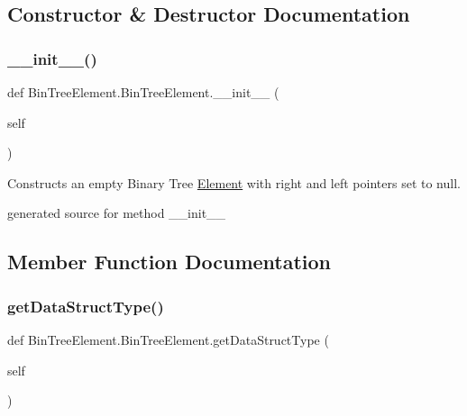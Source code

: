 \subsection{Constructor \& Destructor Documentation}
\hypertarget{class_bin_tree_element_1_1_bin_tree_element_a9a6be9d4770ea3113e0e622b0d71a035}{}\label{class_bin_tree_element_1_1_bin_tree_element_a9a6be9d4770ea3113e0e622b0d71a035} 
\subsubsection{\texorpdfstring{\+\_\+\+\_\+init\+\_\+\+\_\+()}{\_\_init\_\_()}}
{\footnotesize\ttfamily def Bin\+Tree\+Element.\+Bin\+Tree\+Element.\+\_\+\+\_\+init\+\_\+\+\_\+ (\begin{DoxyParamCaption}\item[{}]{self }\end{DoxyParamCaption})}



Constructs an empty Binary Tree \hyperlink{namespace_element}{Element} with right and left pointers set to null. 

\begin{DoxyVerb}generated source for method __init__ \end{DoxyVerb}
 

\subsection{Member Function Documentation}
\hypertarget{class_bin_tree_element_1_1_bin_tree_element_a74e275475f366145d4987458ad08841b}{}\label{class_bin_tree_element_1_1_bin_tree_element_a74e275475f366145d4987458ad08841b} 
\subsubsection{\texorpdfstring{get\+Data\+Struct\+Type()}{getDataStructType()}}
{\footnotesize\ttfamily def Bin\+Tree\+Element.\+Bin\+Tree\+Element.\+get\+Data\+Struct\+Type (\begin{DoxyParamCaption}\item[{}]{self }\end{DoxyParamCaption})}



